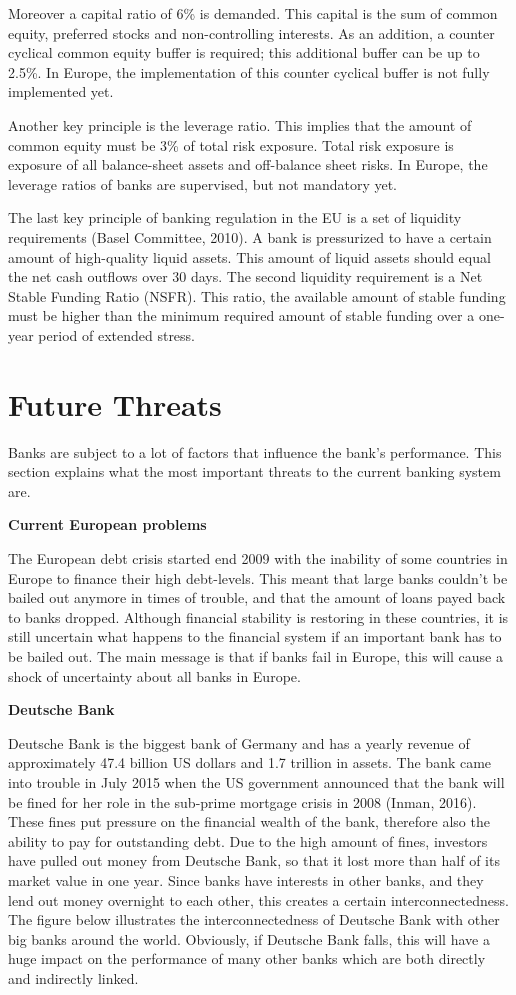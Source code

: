 \documentclass[DIV=calc, paper=a4, fontsize=11pt, twocolumn]{scrartcl}	 %
\begin{document}
Moreover a capital ratio of 6\% is demanded. This capital is the sum of common equity, preferred stocks and non-controlling interests. As an addition, a counter cyclical common equity buffer is required; this additional buffer can be up to 2.5\%. In Europe, the implementation of this counter cyclical buffer is not fully implemented yet.

Another key principle is the leverage ratio. This implies that the amount of common equity must be 3\% of total risk exposure. Total risk exposure is exposure of all balance-sheet assets and off-balance sheet risks. In Europe, the leverage ratios of banks are supervised, but not mandatory yet.

The last key principle of banking regulation in the EU is a set of liquidity requirements (Basel Committee, 2010). A bank is pressurized to have a certain amount of high-quality liquid assets. This amount of liquid assets should equal the net cash outflows over 30 days. The second liquidity requirement is a Net Stable Funding Ratio (NSFR). This ratio, the available amount of stable funding must be higher than the minimum required amount of stable funding over a one-year period of extended stress.

\section*{Future Threats}
Banks are subject to a lot of factors that influence the bank’s performance. This section explains what the most important threats to the current banking system are. 

\textbf{Current European problems}

The European debt crisis started end 2009 with the inability of some countries in Europe to finance their high debt-levels. This meant that large banks couldn’t be bailed out anymore in times of trouble, and that the amount of loans payed back to banks dropped. Although financial stability is restoring in these countries, it is still uncertain what happens to the financial system if an important bank has to be bailed out. The main message is that if banks fail in Europe, this will cause a shock of uncertainty about all banks in Europe.

\textbf{Deutsche Bank}

Deutsche Bank is the biggest bank of Germany and has a yearly revenue of approximately 47.4 billion US dollars and 1.7 trillion in assets. The bank came into trouble in July 2015 when the US government announced that the bank will be fined for her role in the sub-prime mortgage crisis in 2008 (Inman, 2016). These fines put pressure on the financial wealth of the bank, therefore also the ability to pay for outstanding debt. Due to the high amount of fines, investors have pulled out money from Deutsche Bank, so that it lost more than half of its market value in one year. Since banks have interests in other banks, and they lend out money overnight to each other, this creates a certain interconnectedness. The figure below illustrates the interconnectedness of Deutsche Bank with other big banks around the world. Obviously, if Deutsche Bank falls, this will have a huge impact on the performance of many other banks which are both directly and indirectly linked. 
\end{document}
